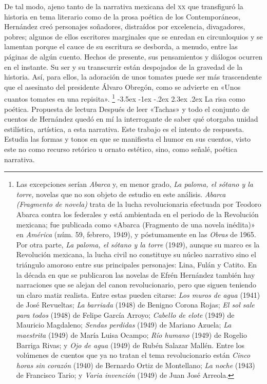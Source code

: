 \documentclass[14pt,twoside,final]{extbook} %
\makeatletter
\let\oldfootnote\footnote
\renewcommand\footnote[1]{%
\oldfootnote{\hspace{1mm}#1}}
\renewcommand\section{\@startsection {section}{1}{\z@}%
                                     {-3.5ex \@plus -1ex \@minus -.2ex}%
                                     {2.3ex \@plus .2ex}%
                                     {\normalfont\large\bfseries\sc}}
\makeatother
\begin{document}
De tal modo, ajeno tanto de la narrativa mexicana del \textsc{xx} que transfiguró la historia en tema literario como de la prosa poética de los Contemporáneos, Hernández creó personajes soñadores, distraídos por excelencia, divagadores, pobres; algunos de ellos escritores marginales que se enredan en circunloquios y se lamentan porque el cauce de su escritura se desborda, a menudo, entre las páginas de algún cuento. Hechos de presente, sus pensamientos y diálogos ocurren en el instante. Su ser y su transcurrir están despojados de la gravedad de la historia. Así, para ellos, la adoración de unos tomates puede ser más trascendente que el asesinato del presidente Álvaro Obregón, como se advierte en «Unos cuantos tomates en una repisita».\footnote{Las excepciones serían \emph{Abarca} y, en menor grado, \emph{La paloma, el sótano y la torre,} novelas que no son objeto de estudio en este análisis. \emph{Abarca (Fragmento de novela)} trata de la lucha revolucionaria efectuada por Teodoro Abarca contra los federales y está ambientada en el periodo de la Revolución mexicana; fue publicada como «Abarca (Fragmento de una novela inédita)» en \emph{América} (núm. 59, febrero, 1949), y póstumamente en las \emph{Obras} de 1965. Por otra parte, \emph{La paloma, el sótano y la torre} (1949), aunque su marco es la Revolución mexicana, la lucha civil no constituye su núcleo narrativo sino el triángulo amoroso entre sus principales personajes: Lina, Fulán y Catito. En la década en que se publicaron las novelas de Efrén Hernández también hay narraciones que se alejan del canon revolucionario, pero que siguen teniendo un claro matiz realista. Entre estas pueden citarse: \emph{Los muros de agua} (1941) de José Revueltas; \emph{La barriada} (1948) de Benigno Corona Rojas; \emph{El sol sale para todos} (1948) de Felipe García Arroyo; \emph{Cabello de elote} (1949) de Mauricio Magdaleno; \emph{Sendas perdidas} (1949) de Mariano Azuela; \emph{La maestrita} (1949) de María Luisa Ocampo; \emph{Río humano} (1949) de Rogelio Barriga Rivas; y \emph{Ojo de agua} (1949) de Rubén Salazar Mallén. Entre los volúmenes de cuentos que ya no tratan el tema revolucionario están \emph{Cinco horas sin corazón} (1940) de Bernardo Ortiz de Montellano; \emph{La noche} (1943) de Francisco Tario; y \emph{Varia invención} (1949) de Juan José Arreola.}
\section{La risa como poética. Propuesta de lectura}\label{sec:la-risa-como-poetica-propuesta-de-lectura}\protect\enlargethispage*{\baselineskip}
Después de leer «Tachas» y todo el conjunto de cuentos de Hernández quedó en mí la interrogante de saber qué otorgaba unidad estilística, artística, a esta narrativa. Este trabajo es el intento de respuesta. Estudia las formas y tonos en que se manifiesta el humor en sus cuentos, visto este no como recurso retórico u ornato estético, sino, como señalé, poética narrativa.
\end{document}

